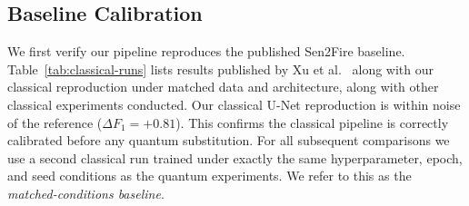 \documentclass{article}
\begin{document}
\subsection{Baseline Calibration}

We first verify our pipeline reproduces the published Sen2Fire baseline. Table~\ref{tab:classical-runs} lists results published by Xu et al.~\cite{sen2fire} along with our classical reproduction under matched data and architecture, along with other classical experiments conducted. Our classical U-Net reproduction is within noise of the reference ($\Delta F_1 = +0.81$). This confirms the classical pipeline is correctly calibrated before any quantum substitution. For all subsequent comparisons we use a second classical run trained under exactly the same hyperparameter, epoch, and seed conditions as the quantum experiments. We refer to this as the \emph{matched-conditions baseline}.

\begin{table}[H]
    \centering
    \small
    \setlength{\tabcolsep}{4pt}
    \caption{Classical baselines on Sen2Fire (Zaratan A100/H100, seed $1234$). Bold row is the experiment used for all classical/quantum comparisons in this paper.}
    \label{tab:classical-runs}
\end{table}
\end{document}
